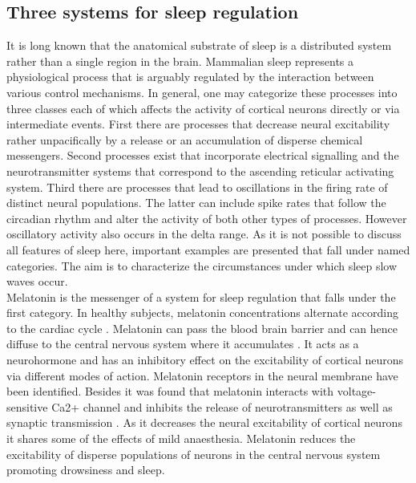 \subsection{Three systems for sleep regulation}
It is long known that the anatomical substrate of sleep is a distributed system rather than a single region in the brain\parencite{akert1965anatomical}. Mammalian sleep represents a physiological process that is arguably regulated by the interaction between various control mechanisms. In general, one may categorize these processes into three classes each of which affects the activity of cortical neurons directly or via intermediate events. First there are processes that decrease neural excitability rather unpacifically by a release or an accumulation of disperse chemical messengers. Second processes exist that incorporate electrical signalling and the neurotransmitter systems that correspond to the ascending reticular activating system. Third there are processes that lead to oscillations in the firing rate of distinct neural populations. The latter can include spike rates that follow the circadian rhythm and alter the activity of both other types of processes. However oscillatory activity also occurs in the delta range. As it is not possible to discuss all features of sleep here, important examples are presented that fall under named categories. The aim is to characterize the circumstances under which sleep slow waves occur.\\
Melatonin is the messenger of a system for sleep regulation that falls under the first category. In healthy subjects, melatonin concentrations alternate according to the cardiac cycle \parencite{montagna2005fatal}. Melatonin can pass the blood brain barrier and can hence diffuse to the central nervous system where it accumulates \parencite{aulinas2019physiology}. It acts as a neurohormone and has an inhibitory effect on the excitability of cortical neurons via different modes of action. Melatonin receptors in the neural membrane have been identified. Besides it was found that melatonin interacts with voltage-sensitive Ca2+ channel and inhibits the release of neurotransmitters as well as synaptic transmission \parencite{choi2014melatonin}. As it decreases the neural excitability of cortical neurons it shares some of the effects of mild anaesthesia. Melatonin reduces the excitability of disperse populations of neurons in the central nervous system promoting drowsiness and sleep. \\
